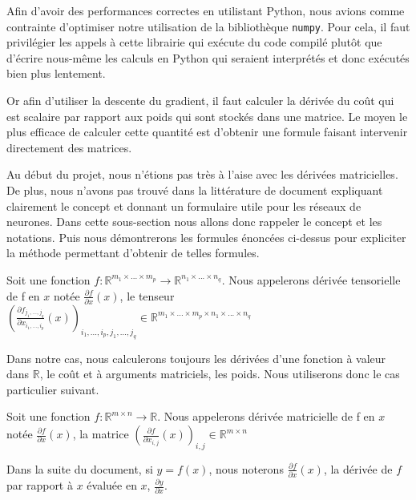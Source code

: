 Afin d'avoir des performances correctes en utilistant Python, nous avions comme contrainte d'optimiser notre utilisation de la bibliothèque \texttt{numpy}. Pour cela, il faut privilégier les appels à cette librairie qui exécute du code compilé plutôt que d'écrire nous-même les calculs en Python qui seraient interprétés et donc exécutés bien plus lentement.

Or afin d'utiliser la descente du gradient, il faut calculer la dérivée du coût qui est scalaire par rapport aux poids qui sont stockés dans une matrice. Le moyen le plus efficace  de calculer cette quantité est d'obtenir une formule faisant intervenir directement des matrices.

Au début du projet, nous n'étions pas très à l'aise avec les dérivées matricielles. De plus, nous n'avons pas trouvé dans la littérature de document expliquant clairement le concept et donnant un formulaire utile pour les réseaux de neurones. Dans cette sous-section nous allons donc rappeler le concept et les notations. Puis nous démontrerons les formules énoncées ci-dessus pour expliciter la méthode permettant d'obtenir de telles formules.

\begin{definition}
Soit une fonction $f : \mathbb{R}^{m_1 \times ... \times m_p} \rightarrow \mathbb{R}^{n_1 \times ... \times n_q}$. Nous appelerons dérivée tensorielle de f en $x$ notée $\frac{\partial f}{\partial x}(x)$, le tenseur $(\frac{\partial f_{j_1, ..., j_q}}{\partial x_{i_1, ..., i_p}}(x))_{i_1, ..., i_p, j_1, ..., j_q} \in  \mathbb{R}^{m_1 \times ... \times m_p \times n_1 \times ... \times n_q}$ 
\end{definition}

Dans notre cas, nous calculerons toujours les dérivées d'une fonction à valeur dans $\mathbb{R}$, le coût et à arguments matriciels, les poids. Nous utiliserons donc le cas particulier suivant.

\begin{definition}
Soit une fonction $f : \mathbb{R}^{m \times n} \rightarrow \mathbb{R}$. Nous appelerons dérivée matricielle de f en $x$ notée $\frac{\partial f}{\partial x}(x)$, la matrice $(\frac{\partial f}{\partial x_{i, j}}(x))_{i, j} \in  \mathbb{R}^{m \times n}$ 
\end{definition}

\begin{remark}
Dans la suite du document, si $y = f(x)$, nous noterons $\frac{\partial f}{\partial x}(x)$, la dérivée de $f$ par rapport à $x$ évaluée en $x$, $\frac{\partial y}{\partial x}$.
\end{remark}

